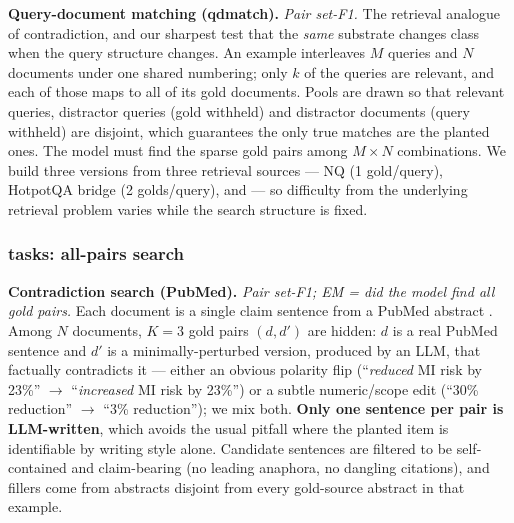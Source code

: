 \textbf{Query-document matching (qdmatch).} \emph{Pair set-F1.} The retrieval analogue of contradiction, and our sharpest test that the \emph{same} substrate changes class when the query structure changes. An example interleaves $M$ queries and $N$ documents under one shared numbering; only $k$ of the queries are relevant, and each of those maps to all of its gold documents. Pools are drawn so that relevant queries, distractor queries (gold withheld) and distractor documents (query withheld) are disjoint, which guarantees the only true matches are the planted ones. The model must find the sparse gold pairs among $M \times N$ combinations. We build three versions from three retrieval sources --- NQ (1 gold/query), HotpotQA bridge (2 golds/query), and  --- so difficulty from the underlying retrieval problem varies while the search structure is fixed.

\subsubsection{\texorpdfstring{}{OT(N2)} tasks: all-pairs search}


\textbf{Contradiction search (PubMed).} \emph{Pair set-F1; EM = did the model find all gold pairs.} Each document is a single claim sentence from a PubMed abstract \citep{Jin2019PubMedQAAD}. Among $N$ documents, $K{=}3$ gold pairs $(d, d')$ are hidden: $d$ is a real PubMed sentence and $d'$ is a minimally-perturbed version, produced by an LLM, that factually contradicts it --- either an obvious polarity flip (``\emph{reduced} MI risk by 23\%'' $\to$ ``\emph{increased} MI risk by 23\%'') or a subtle numeric/scope edit (``30\% reduction'' $\to$ ``3\% reduction''); we mix both. \textbf{Only one sentence per pair is LLM-written}, which avoids the usual pitfall where the planted item is identifiable by writing style alone. Candidate sentences are filtered to be self-contained and claim-bearing (no leading anaphora, no dangling citations), and fillers come from abstracts disjoint from every gold-source abstract in that example.


